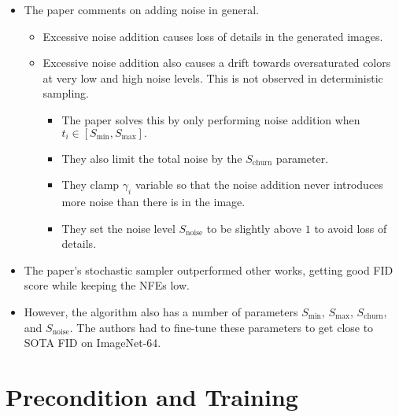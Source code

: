 \documentclass[10pt]{article}
\begin{document}
\begin{itemize}
  \item The paper comments on adding noise in general.
  \begin{itemize}
    \item Excessive noise addition causes loss of details in the generated images.
    \item Excessive noise addition also causes a drift towards oversaturated colors at very low and high noise levels. This is not observed in deterministic sampling.
    \begin{itemize}
      \item The paper solves this by only performing noise addition when $t_i \in [S_{\min}, S_{\max}].$
      \item They also limit the total noise by the $S_{\mathrm{churn}}$ parameter.
      \item They clamp $\gamma_i$ variable so that the noise addition never introduces more noise than there is in the image.
      \item They set the noise level $S_{\mathrm{noise}}$ to be slightly above $1$ to avoid loss of details.
    \end{itemize}
  \end{itemize}

  \item The paper's stochastic sampler outperformed other works, getting good FID score while keeping the NFEs low. 
  
  \item However, the algorithm also has a number of parameters $S_{\min}$, $S_{\max}$, $S_{\mathrm{churn}}$, and $S_{\mathrm{noise}}$. The authors had to fine-tune these parameters to get close to SOTA FID on ImageNet-64.
\end{itemize}

\section{Precondition and Training}
\end{document}
